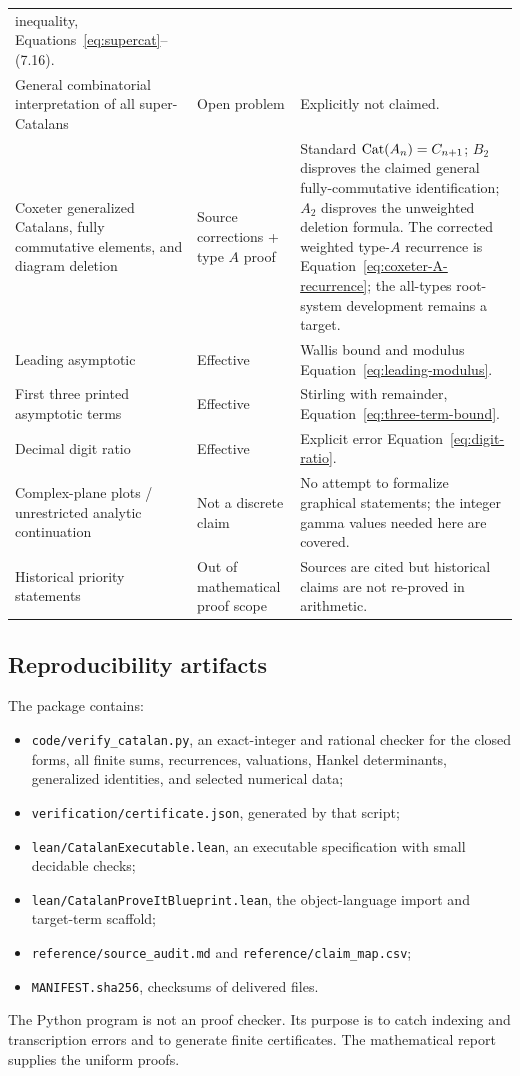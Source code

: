 \begin{longtable}{@{}p{}p{}p{}@{}}
inequality, Equations~\eqref{eq:supercat}--(7.16).\\
General combinatorial interpretation of all super-Catalans & Open problem &
Explicitly not claimed.\\
Coxeter generalized Catalans, fully commutative elements, and diagram
deletion & Source corrections + type $A$ proof & Standard
$\operatorname{Cat}(A_n)=C_{n+1}$; $B_2$ disproves the claimed general
fully-commutative identification; $A_2$ disproves the unweighted deletion
formula.  The corrected weighted type-$A$ recurrence is
Equation~\eqref{eq:coxeter-A-recurrence}; the all-types root-system development
remains a target.\\
Leading asymptotic & Effective & Wallis bound and modulus
Equation~\eqref{eq:leading-modulus}.\\
First three printed asymptotic terms & Effective & Stirling with remainder,
Equation~\eqref{eq:three-term-bound}.\\
Decimal digit ratio & Effective & Explicit error
Equation~\eqref{eq:digit-ratio}.\\
Complex-plane plots / unrestricted analytic continuation & Not a discrete
claim & No attempt to formalize graphical statements; the integer gamma values
needed here are covered.\\
Historical priority statements & Out of mathematical proof scope & Sources
are cited but historical claims are not re-proved in arithmetic.\\
\bottomrule
\end{longtable}
\normalsize

\subsection{Reproducibility artifacts}

The package contains:
\begin{itemize}[leftmargin=2em]
\item \texttt{code/verify\_catalan.py}, an exact-integer and rational checker
      for the closed forms, all finite sums, recurrences, valuations, Hankel
      determinants, generalized identities, and selected numerical data;
\item \texttt{verification/certificate.json}, generated by that script;
\item \texttt{lean/CatalanExecutable.lean}, an executable specification with
      small decidable checks;
\item \texttt{lean/CatalanProveItBlueprint.lean}, the object-language import
      and target-term scaffold;
\item \texttt{reference/source\_audit.md} and
      \texttt{reference/claim\_map.csv};
\item \texttt{MANIFEST.sha256}, checksums of delivered files.
\end{itemize}
The Python program is not an \ipra{} proof checker.  Its purpose is to catch
indexing and transcription errors and to generate finite certificates.  The
mathematical report supplies the uniform proofs.

